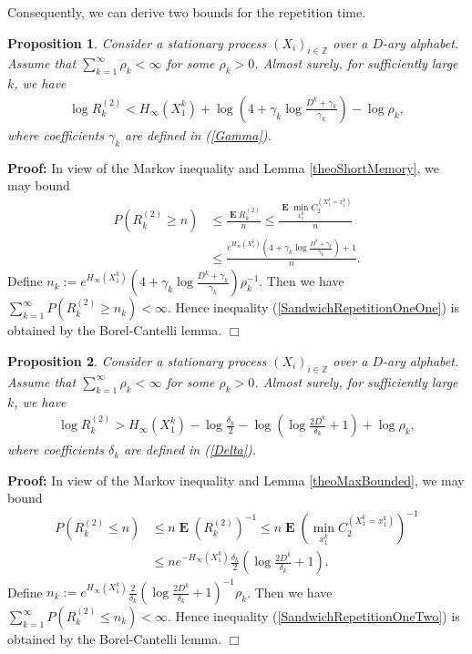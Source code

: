 \documentclass[a4paper,12pt]{article}
\newcommand{\okra}[1]{\left( #1 \right)}
\DeclareMathOperator{\mean}{\mathbf{E}}
\newtheorem{proposition}{Proposition}
\newenvironment*{proof}{\begin{trivlist}\item[]
\noindent\textbf{Proof:}}{$\Box$\par\end{trivlist}}
\begin{document}
Consequently, we can derive two bounds for the repetition time.
\begin{proposition}
  \label{theoSandwichRepetitionOneOne}
  Consider a stationary process $(X_i)_{i\in\mathbb{Z}}$ over a
  $D$-ary alphabet.  Assume that $\sum_{k=1}^\infty \rho_k<\infty$ for
  some $\rho_k>0$.  Almost surely, for sufficiently large $k$, we have
  \begin{align}
    \label{SandwichRepetitionOneOne}
    \log R^{(2)}_k<H_\infty(X_1^k)+\log
    \okra{4+\gamma_k\log\frac{D^k+\gamma_k}{\gamma_k}}
    -\log\rho_k
    ,
  \end{align}
  where coefficients $\gamma_k$ are defined in (\ref{Gamma}).
\end{proposition}
\begin{proof}
  In view of the Markov inequality and Lemma \ref{theoShortMemory},
  we may bound
  \begin{align}
    P(R^{(2)}_k\ge n)
    &\le \frac{\mean R^{(2)}_k}{n}
      \le \frac{\mean \min_{x_1^k} C^{(X_1^k=x_1^k)}_2}{n}
      \nonumber\\
     &\le \frac{e^{H_\infty(X_1^k)}
      \okra{4+\gamma_k\log\frac{D^k+\gamma_k}{\gamma_k}}+1}{n}.
  \end{align}
  Define
  $n_k:=e^{H_\infty(X_1^k)}
  \okra{4+\gamma_k\log\frac{D^k+\gamma_k}{\gamma_k}}\rho_k^{-1}$. Then
  we have $\sum_{k=1}^\infty P(R^{(2)}_k\ge n_k)<\infty$. Hence
  inequality (\ref{SandwichRepetitionOneOne}) is obtained by the
  Borel-Cantelli lemma.
\end{proof}
\begin{proposition}
  \label{theoSandwichRepetitionOneTwo}
  Consider a stationary process $(X_i)_{i\in\mathbb{Z}}$ over a
  $D$-ary alphabet.  Assume that $\sum_{k=1}^\infty \rho_k<\infty$ for
  some $\rho_k>0$.  Almost surely, for sufficiently large $k$, we have
  \begin{align}
    \label{SandwichRepetitionOneTwo}
    \log R^{(2)}_k>H_\infty(X_1^k)-\log \frac{\delta_k}{2}
    -\log\okra{\log\frac{2D^k}{\delta_k}+1}
    +\log\rho_k
    ,
  \end{align}
  where coefficients $\delta_k$ are defined in (\ref{Delta}).
\end{proposition}
\begin{proof}
  In view of the Markov inequality and Lemma \ref{theoMaxBounded},
  we may bound
  \begin{align}
    P(R^{(2)}_k\le n)
    &\le n\mean \okra{R^{(2)}_k}^{-1}
      \le n\mean \okra{\min_{x_1^k} C^{(X_1^k=x_1^k)}_2}^{-1}
      \nonumber\\
    &\le n e^{-H_\infty(X_1^k)}
      \frac{\delta_k}{2}\okra{\log\frac{2D^k}{\delta_k}+1}.
  \end{align}
  Define
  $n_k:=e^{H_\infty(X_1^k)}
  \frac{2}{\delta_k}\okra{\log\frac{2D^k}{\delta_k}+1}^{-1}\rho_k$. Then
  we have $\sum_{k=1}^\infty P(R^{(2)}_k\le n_k)<\infty$. Hence
  inequality (\ref{SandwichRepetitionOneTwo}) is obtained by the
  Borel-Cantelli lemma.
\end{proof}
\end{document}
